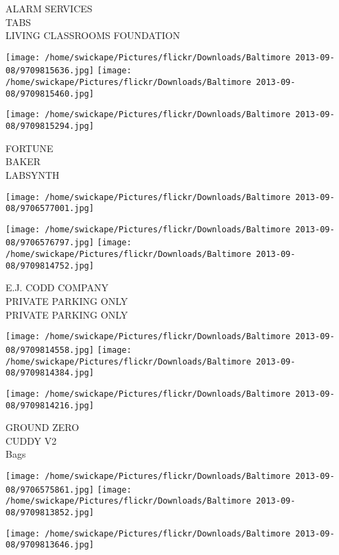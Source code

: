 \documentclass[10pt,letterpaper]{article}
\begin{document}
ALARM SERVICES\\
TABS\\
LIVING CLASSROOMS FOUNDATION\\
\pagebreak

\texttt{[image: /home/swickape/Pictures/flickr/Downloads/Baltimore 2013-09-08/9709815636.jpg]}
\texttt{[image: /home/swickape/Pictures/flickr/Downloads/Baltimore 2013-09-08/9709815460.jpg]}

\texttt{[image: /home/swickape/Pictures/flickr/Downloads/Baltimore 2013-09-08/9709815294.jpg]}

FORTUNE\\
BAKER\\
LABSYNTH\\
\pagebreak

\texttt{[image: /home/swickape/Pictures/flickr/Downloads/Baltimore 2013-09-08/9706577001.jpg]}

\vspace{0.25in}
\texttt{[image: /home/swickape/Pictures/flickr/Downloads/Baltimore 2013-09-08/9706576797.jpg]}
\texttt{[image: /home/swickape/Pictures/flickr/Downloads/Baltimore 2013-09-08/9709814752.jpg]}

E.J. CODD COMPANY\\
PRIVATE PARKING ONLY\\
PRIVATE PARKING ONLY\\
\pagebreak

\texttt{[image: /home/swickape/Pictures/flickr/Downloads/Baltimore 2013-09-08/9709814558.jpg]}
\texttt{[image: /home/swickape/Pictures/flickr/Downloads/Baltimore 2013-09-08/9709814384.jpg]}

\vspace{0.25in}
\texttt{[image: /home/swickape/Pictures/flickr/Downloads/Baltimore 2013-09-08/9709814216.jpg]}

GROUND ZERO\\
CUDDY V2\\
Bags\\
\pagebreak

\texttt{[image: /home/swickape/Pictures/flickr/Downloads/Baltimore 2013-09-08/9706575861.jpg]}
\texttt{[image: /home/swickape/Pictures/flickr/Downloads/Baltimore 2013-09-08/9709813852.jpg]}

\texttt{[image: /home/swickape/Pictures/flickr/Downloads/Baltimore 2013-09-08/9709813646.jpg]}
\end{document}
